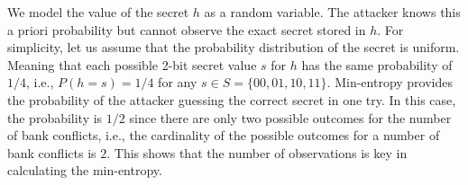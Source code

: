 We model the value of the secret $h$ as a random variable.
%
The attacker knows this a priori probability but cannot 
observe the exact secret stored in $h$.
%
For simplicity, let us assume that the probability distribution of the secret is uniform.
%
Meaning that each possible 2-bit secret value $s$ for $h$ has the same probability of $1/4$, i.e., $P(h=s)= 1/4$ for any $s\in S=\{00,01,10,11\}$.
%
%
Min-entropy provides the probability of the attacker guessing the correct secret in one try.
%
In this case, the probability is $1/2$ since there are only two possible outcomes for the number of bank conflicts, i.e., the cardinality of the possible outcomes for a number of bank conflicts is $2$.
%
This shows that the number of observations is key in calculating the min-entropy.


